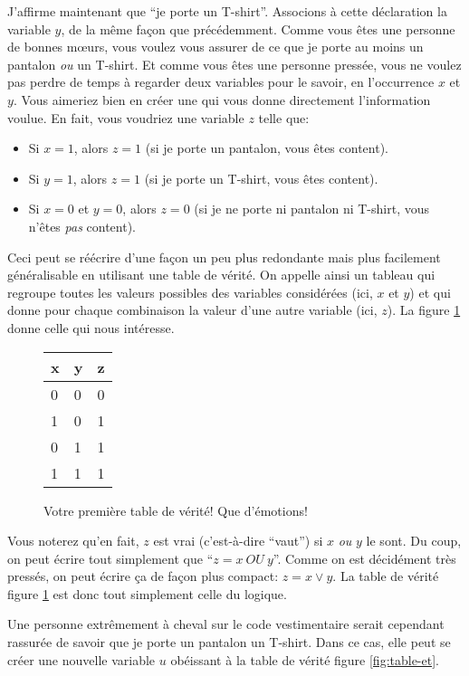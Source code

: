 J'affirme maintenant que ``je porte un T-shirt''. Associons à cette
déclaration la variable $y$, de la même façon que précédemment. Comme
vous êtes une personne de bonnes mœurs, vous voulez vous assurer de ce
que je porte au moins un pantalon \emph{ou} un T-shirt. Et comme vous
êtes une personne pressée, vous ne voulez pas perdre de temps à
regarder deux variables pour le savoir, en l'occurrence $x$ et
$y$. Vous aimeriez bien en créer une qui vous donne directement
l'information voulue. En fait, vous voudriez une variable $z$ telle que:
\begin{itemize}
  \item Si $x=1$, alors $z=1$ (si je porte un pantalon, vous êtes content).
  \item Si $y=1$, alors $z=1$ (si je porte un T-shirt, vous êtes content).
  \item Si $x=0$ et $y=0$, alors $z=0$ (si je ne porte ni pantalon ni
    T-shirt, vous n'êtes \emph{pas} content).
\end{itemize}

Ceci peut se réécrire d'une façon un peu plus redondante mais plus
facilement généralisable en utilisant une table de vérité. On appelle
ainsi un tableau qui regroupe toutes les valeurs possibles des
variables considérées (ici, $x$ et $y$) et qui donne pour chaque
combinaison la valeur d'une autre variable (ici, $z$). La figure
\ref{fig:table-ou} donne celle qui nous intéresse.

\begin{figure}[ht]
  \centering
  \begin{tabular}{ll|l}
    x & y & z \\ \hline
    0 & 0 & 0 \\
    1 & 0 & 1 \\
    0 & 1 & 1 \\
    1 & 1 & 1 \\
  \end{tabular}
  \caption{Votre première table de vérité! Que d'émotions!}
  \label{fig:table-ou}
\end{figure}

Vous noterez qu'en fait, $z$ est vrai (c'est-à-dire ``vaut'') si $x$
\emph{ou} $y$ le sont. Du coup, on peut écrire tout simplement que
``$z = x ~OU~ y$''. Comme on est décidément très pressés, on peut
écrire ça de façon plus compact: $z = x \lor y$. La table de vérité
figure \ref{fig:table-ou} est donc tout simplement celle du
 logique.

Une personne extrêmement à cheval sur le code vestimentaire serait
cependant rassurée de savoir que je porte un pantalon
 un T-shirt. Dans ce cas, elle peut se créer une
nouvelle variable $u$ obéissant à la table de vérité figure
\ref{fig:table-et}.

